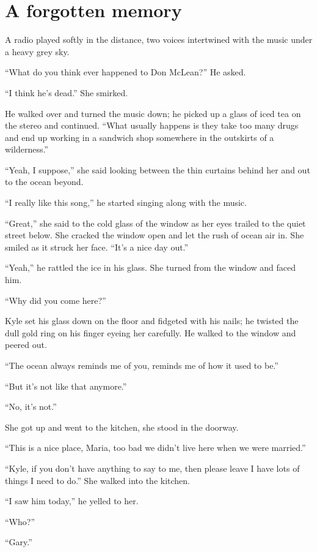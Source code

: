 \section{A forgotten memory}\label{a-forgotten-memory}

A radio played softly in the distance, two voices intertwined with the
music under a heavy grey sky.

``What do you think ever happened to Don McLean?'' He asked.

``I think he's dead.'' She smirked.

He walked over and turned the music down; he picked up a glass of iced
tea on the stereo and continued. ``What usually happens is they take too
many drugs and end up working in a sandwich shop somewhere in the
outskirts of a wilderness.''

``Yeah, I suppose,'' she said looking between the thin curtains behind
her and out to the ocean beyond.

``I really like this song,'' he started singing along with the music.

``Great,'' she said to the cold glass of the window as her eyes trailed
to the quiet street below. She cracked the window open and let the rush
of ocean air in. She smiled as it struck her face. ``It's a nice day
out.''

``Yeah,'' he rattled the ice in his glass. She turned from the window
and faced him.

``Why did you come here?''

Kyle set his glass down on the floor and fidgeted with his nails; he
twisted the dull gold ring on his finger eyeing her carefully. He walked
to the window and peered out.

``The ocean always reminds me of you, reminds me of how it used to be.''

``But it's not like that anymore.''

``No, it's not.''

She got up and went to the kitchen, she stood in the doorway.

``This is a nice place, Maria, too bad we didn't live here when we were
married.''

``Kyle, if you don't have anything to say to me, then please leave I
have lots of things I need to do.'' She walked into the kitchen.

``I saw him today,'' he yelled to her.

``Who?''

``Gary.''

